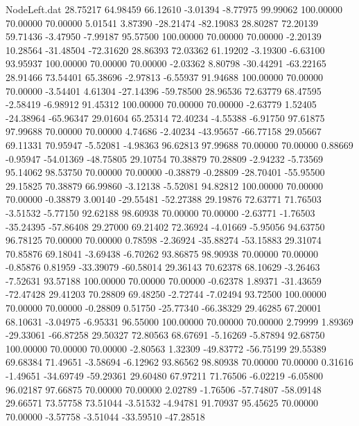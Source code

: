 \begin{filecontents}{NodeLeft.dat}
  28.75217   64.98459   66.12610    -3.01394   -8.77975   99.99062  100.00000   70.00000   70.00000    5.01541    3.87390  -28.21474  -82.19083
  28.80287   72.20139   59.71436    -3.47950   -7.99187   95.57500  100.00000   70.00000   70.00000   -2.20139   10.28564  -31.48504  -72.31620
  28.86393   72.03362   61.19202    -3.19300   -6.63100   93.95937  100.00000   70.00000   70.00000   -2.03362    8.80798  -30.44291  -63.22165
  28.91466   73.54401   65.38696    -2.97813   -6.55937   91.94688  100.00000   70.00000   70.00000   -3.54401    4.61304  -27.14396  -59.78500
  28.96536   72.63779   68.47595    -2.58419   -6.98912   91.45312  100.00000   70.00000   70.00000   -2.63779    1.52405  -24.38964  -65.96347
  29.01604   65.25314   72.40234    -4.55388   -6.91750   97.61875   97.99688   70.00000   70.00000    4.74686   -2.40234  -43.95657  -66.77158
  29.05667   69.11331   70.95947    -5.52081   -4.98363   96.62813   97.99688   70.00000   70.00000    0.88669   -0.95947  -54.01369  -48.75805
  29.10754   70.38879   70.28809    -2.94232   -5.73569   95.14062   98.53750   70.00000   70.00000   -0.38879   -0.28809  -28.70401  -55.95500
  29.15825   70.38879   66.99860    -3.12138   -5.52081   94.82812  100.00000   70.00000   70.00000   -0.38879    3.00140  -29.55481  -52.27388
  29.19876   72.63771   71.76503    -3.51532   -5.77150   92.62188   98.60938   70.00000   70.00000   -2.63771   -1.76503  -35.24395  -57.86408
  29.27000   69.21402   72.36924    -4.01669   -5.95056   94.63750   96.78125   70.00000   70.00000    0.78598   -2.36924  -35.88274  -53.15883
  29.31074   70.85876   69.18041    -3.69438   -6.70262   93.86875   98.90938   70.00000   70.00000   -0.85876    0.81959  -33.39079  -60.58014
  29.36143   70.62378   68.10629    -3.26463   -7.52631   93.57188  100.00000   70.00000   70.00000   -0.62378    1.89371  -31.43659  -72.47428
  29.41203   70.28809   69.48250    -2.72744   -7.02494   93.72500  100.00000   70.00000   70.00000   -0.28809    0.51750  -25.77340  -66.38329
  29.46285   67.20001   68.10631    -3.04975   -6.95331   96.55000  100.00000   70.00000   70.00000    2.79999    1.89369  -29.33061  -66.87258
  29.50327   72.80563   68.67691    -5.16269   -5.87894   92.68750  100.00000   70.00000   70.00000   -2.80563    1.32309  -49.83772  -56.75199
  29.55389   69.68384   71.49651    -3.58694   -6.12962   93.86562   98.80938   70.00000   70.00000    0.31616   -1.49651  -34.69749  -59.29361
  29.60480   67.97211   71.76506    -6.02219   -6.05800   96.02187   97.66875   70.00000   70.00000    2.02789   -1.76506  -57.74807  -58.09148
  29.66571   73.57758   73.51044    -3.51532   -4.94781   91.70937   95.45625   70.00000   70.00000   -3.57758   -3.51044  -33.59510  -47.28518

\end{filecontents}
